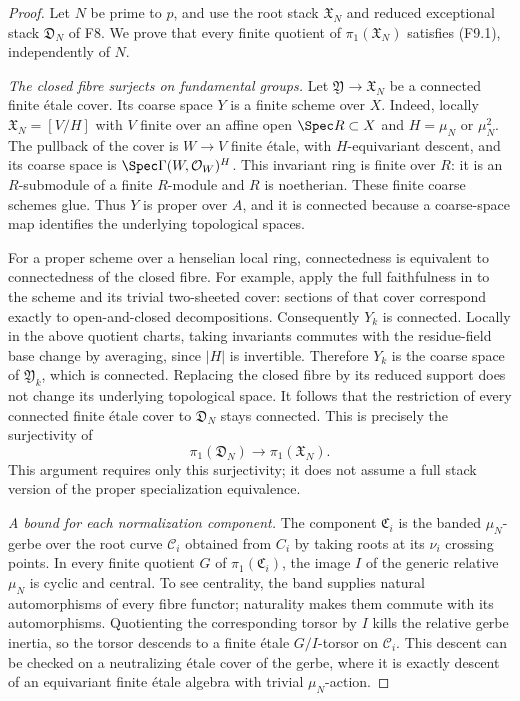 \begin{proof}
Let $N$ be prime to $p$, and use the root stack $\mathfrak X_N$
and reduced exceptional stack $\mathfrak D_N$ of F8. We prove
that every finite quotient of $\pi_1(\mathfrak X_N)$ satisfies
(F9.1), independently of $N$.

\emph{The closed fibre surjects on fundamental groups.}
Let $\mathfrak Y\to\mathfrak X_N$ be a connected finite \'etale
cover. Its coarse space $Y$ is a finite scheme over $X$.
Indeed, locally $\mathfrak X_N=[V/H]$ with $V$ finite over an
affine open $\Spec R\subset X$ and $H=\mu_N$ or $\mu_N^2$.
The pullback of the cover is $W\to V$ finite \'etale, with
$H$-equivariant descent, and its coarse space is
$\Spec\Gamma(W,\mathcal O_W)^H$. This invariant ring is finite
over $R$: it is an $R$-submodule of a finite $R$-module and $R$
is noetherian. These finite coarse schemes glue. Thus $Y$ is
proper over $A$, and it is connected because a coarse-space map
identifies the underlying topological spaces.

For a proper scheme over a henselian local ring, connectedness
is equivalent to connectedness of the closed fibre. For example,
apply the full faithfulness in
\cite[Lemma 58.9.1, tag 0A48]{StacksProperEtaleSpecialization}
to the scheme and its trivial two-sheeted cover: sections of that
cover correspond exactly to open-and-closed decompositions.
Consequently $Y_k$ is connected. Locally in the above quotient
charts, taking invariants commutes with the residue-field base
change by averaging, since $|H|$ is invertible. Therefore $Y_k$
is the coarse space of $\mathfrak Y_k$, which is connected.
Replacing the closed fibre by its reduced support does not change
its underlying topological space. It follows that the restriction
of every connected finite \'etale cover to $\mathfrak D_N$ stays
connected. This is precisely the surjectivity of
\[
 \pi_1(\mathfrak D_N)\longrightarrow\pi_1(\mathfrak X_N).
 \tag{F9.2}
\]
This argument requires only this surjectivity; it does not assume
a full stack version of the proper specialization equivalence.

\emph{A bound for each normalization component.}
The component $\mathfrak C_i$ is the banded $\mu_N$-gerbe over
the root curve $\mathcal C_i$ obtained from $C_i$ by taking roots
at its $\nu_i$ crossing points. In every finite quotient $G$ of
$\pi_1(\mathfrak C_i)$, the image $I$ of the generic relative
$\mu_N$ is cyclic and central. To see centrality, the band supplies
natural automorphisms of every fibre functor; naturality makes
them commute with its automorphisms. Quotienting the corresponding
torsor by $I$ kills the relative gerbe inertia, so the torsor
descends to a finite \'etale $G/I$-torsor on $\mathcal C_i$.
This descent can be checked on a neutralizing \'etale cover of the
gerbe, where it is exactly descent of an equivariant finite \'etale
algebra with trivial $\mu_N$-action.


\end{proof}
